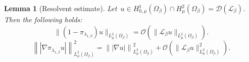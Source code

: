 \documentclass[10pt]{article}
\newcommand{\cL}{\mathcal{L}}
\newcommand{\1}{\mathbbm 1}
\renewcommand{\O}{\mathcal{O}}
\newtheorem{lemma}{Lemma}
\begin{document}
        \begin{lemma}[Resolvent estimate]
            Let~$u\in H_{0,\mu}^1(\Omega_\beta)\cap H^2_\mu(\Omega_\beta) = \mathcal D(\cL_\beta)$. Then the following holds:
            \begin{equation}
                \label{eq:lemma_resolvent_eqa}
                \|(1-\pi_{\lambda_{1,\beta}})u\|_{L^2_\mu(\Omega_\beta)} = \O(\|\cL_\beta u\|_{L^2_\mu(\Omega_\beta)}).
            \end{equation}
            \begin{equation}
                \label{eq:lemma_resolvent_eqb}
                \left\||\nabla \pi_{\lambda_{1,\beta}} u|\right\|_{L^2_\mu(\Omega_\beta)}^2 = \left\||\nabla u|\right\|_{ L^2_\mu(\Omega_\beta)}^2 + \O\left(\|\cL_\beta u\|_{L^2_\mu(\Omega_\beta)}^2\right).
            \end{equation}
        \end{lemma}
\end{document}
